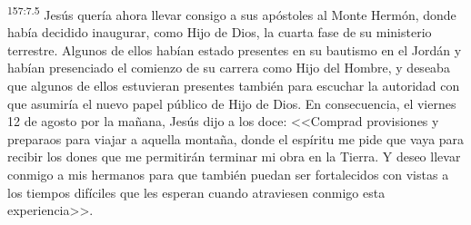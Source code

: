 \par 
\textsuperscript{157:7.5} Jesús quería ahora llevar consigo a sus apóstoles al Monte Hermón, donde había decidido inaugurar, como Hijo de Dios, la cuarta fase de su ministerio terrestre. Algunos de ellos habían estado presentes en su bautismo en el Jordán y habían presenciado el comienzo de su carrera como Hijo del Hombre, y deseaba que algunos de ellos estuvieran presentes también para escuchar la autoridad con que asumiría el nuevo papel público de Hijo de Dios. En consecuencia, el viernes 12 de agosto por la mañana, Jesús dijo a los doce: <<Comprad provisiones y preparaos para viajar a aquella montaña, donde el espíritu me pide que vaya para recibir los dones que me permitirán terminar mi obra en la Tierra. Y deseo llevar conmigo a mis hermanos para que también puedan ser fortalecidos con vistas a los tiempos difíciles que les esperan cuando atraviesen conmigo esta experiencia>>.